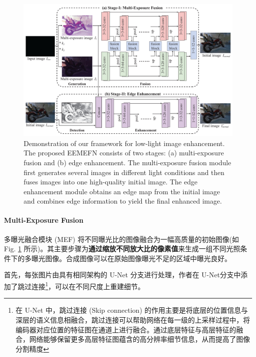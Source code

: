\documentclass[letterpaper,10pt]{article}
\begin{document}
			\begin{figure}[htbp]
				\centering 
				\includegraphics[width=\columnwidth]{picture/LLIE/EEMEFN/EEMEFN framework}
				\caption{
					\label{fig: EEMEFN framework} 
					Demonstration of our framework for low-light image enhancement. The proposed EEMEFN consists of two stages: (a) multi-exposure fusion and (b) edge enhancement. The multi-exposure fusion module first generates several images in different light conditions and then fuses images into one high-quality initial image. The edge enhancement module obtains an edge map from the initial image and combines edge information to yield the final enhanced image.
				}
			\end{figure}
			
			\paragraph{Multi-Exposure Fusion}
			
			多曝光融合模块 (MEF) 将不同曝光比的图像融合为一幅高质量的初始图像(如 Fig. \ref{fig: EEMEFN framework} 所示)。其主要步骤为\textbf{通过缩放不同放大比的像素值}来生成一组不同光照条件下的多曝光图像。合成图像可以在原始图像曝光不足的区域中曝光良好。
			
			首先，每张图片由具有相同架构的 U-Net 分支进行处理，作者在 U-Net分支中添加了跳过连接\footnote{在 U-Net 中，跳过连接 (Skip connection) 的作用主要是将底层的位置信息与深层的语义信息相融合，跳过连接可以帮助网络在每一级的上采样过程中，将编码器对应位置的特征图在通道上进行融合。通过底层特征与高层特征的融合，网络能够保留更多高层特征图蕴含的高分辨率细节信息，从而提高了图像分割精度}，可以在不同尺度上重建细节。
			
\end{document}
